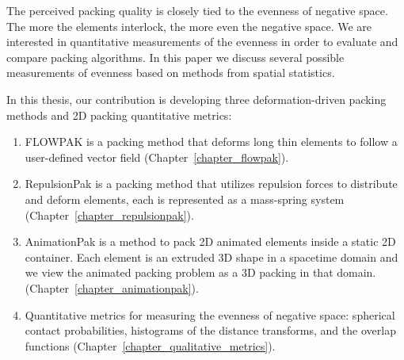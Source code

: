 \newtext
{
The perceived packing quality is closely tied to the evenness of negative space.
The more the elements interlock, the more even the negative space. %
We are interested in quantitative measurements of the evenness 
in order to evaluate and compare packing algorithms.
In this paper we discuss several possible measurements of 
evenness based on methods from spatial statistics.
}

\newtext
{
In this thesis, our contribution is developing three deformation-driven packing methods and 2D packing quantitative metrics:
\begin{enumerate}
\item FLOWPAK is a packing method that deforms long thin elements to follow a user-defined vector field (Chapter~\ref{chapter_flowpak}).
\item RepulsionPak is a packing method that utilizes repulsion forces to distribute and deform elements,
	each is represented as a mass-spring system (Chapter~\ref{chapter_repulsionpak}).
\item AnimationPak is a method to pack 2D animated elements inside a static 2D container. 
	Each element is an extruded 3D shape in a spacetime domain 
	and we view the animated packing problem as a 3D packing in that domain.
	(Chapter~\ref{chapter_animationpak}). 
\item  Quantitative metrics for measuring the evenness of negative space: spherical contact probabilities,
histograms of the distance transforms, and the overlap functions (Chapter~\ref{chapter_qualitative_metrics}). 
\end{enumerate}
}





